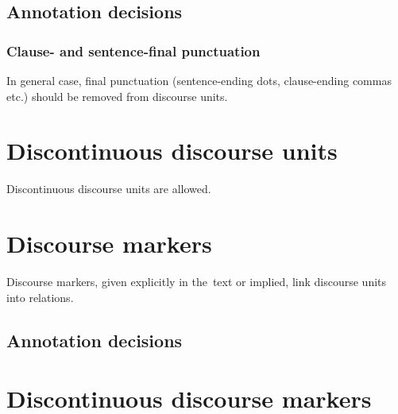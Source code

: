 \documentclass{udisc}
\begin{document}

\subsection{Annotation decisions}


\subsubsection{Clause- and sentence-final punctuation}

In general case, final punctuation (sentence-ending dots, clause-ending commas etc.) should be removed from discourse units.


\section{Discontinuous discourse units}

Discontinuous discourse units are allowed.





\section{Discourse markers}
\label{discourse-markers}

Discourse markers, given explicitly in the~text or implied, link discourse units into relations.



\subsection{Annotation decisions}



\section{Discontinuous discourse markers}
\end{document}
